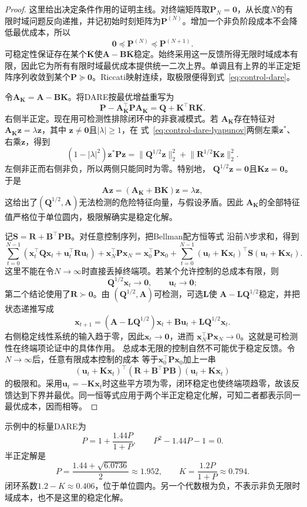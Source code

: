 \begin{proof}
这里给出决定条件作用的证明主线。对终端矩阵取$\bm{P}_N=\bm{0}$，从长度$N$的有限时域问题反向递推，并记初始时刻矩阵为$\bm{P}^{(N)}$。增加一个非负阶段成本不会降低最优成本，所以
\[
  \bm{0}\preceq
  \bm{P}^{(N)}
  \preceq
  \bm{P}^{(N+1)}.
\]
可稳定性保证存在某个$\overline{\bm{K}}$使$\bm{A}-\bm{B}\overline{\bm{K}}$稳定。始终采用这一反馈所得无限时域成本有限，因此它为所有有限时域最优成本提供统一二次上界。单调且有上界的半正定矩阵序列收敛到某个$\bm{P}\succeq\bm{0}$。Riccati映射连续，取极限便得到式~\eqref{eq:control-dare}。

令$\bm{A}_{\bm{K}}=\bm{A}-\bm{B}\bm{K}$。将DARE按最优增益重写为
\begin{equation}
  \bm{P}
  -
  \bm{A}_{\bm{K}}^{\top}
  \bm{P}\bm{A}_{\bm{K}}
  =
  \bm{Q}+\bm{K}^{\top}\bm{R}\bm{K}.
  \label{eq:control-dare-lyapunov}
\end{equation}
右侧半正定。现在用可检测性排除闭环中的非衰减模式。若
$\bm{A}_{\bm K}$存在特征对
$\bm{A}_{\bm K}\bm{z}=\lambda\bm{z}$，其中
$\bm{z}\neq\bm{0}$且$|\lambda|\geq1$，在
式~\eqref{eq:control-dare-lyapunov}两侧左乘$\bm{z}^{*}$、右乘$\bm{z}$，得到
\[
  (1-|\lambda|^2)\bm{z}^{*}\bm{P}\bm{z}
  =
  \lVert\bm{Q}^{1/2}\bm{z}\rVert_2^2
  +
  \lVert\bm{R}^{1/2}\bm{K}\bm{z}\rVert_2^2.
\]
左侧非正而右侧非负，所以两侧只能同时为零。特别地，
$\bm{Q}^{1/2}\bm{z}=\bm{0}$且$\bm{K}\bm{z}=\bm{0}$。于是
\[
  \bm{A}\bm{z}
  =
  (\bm{A}_{\bm K}+\bm{B}\bm{K})\bm{z}
  =
  \lambda\bm{z},
\]
这给出了$(\bm{Q}^{1/2},\bm{A})$无法检测的危险特征向量，与假设矛盾。因此
$\bm{A}_{\bm K}$的全部特征值严格位于单位圆内，极限解确实是稳定化解。

记$\bm{S}=\bm{R}+\bm{B}^{\top}\bm{P}\bm{B}$。对任意控制序列，把Bellman配方恒等式
沿前$N$步求和，得到
\[
  \sum_{t=0}^{N-1}
  \left(
    \bm{x}_t^{\top}\bm{Q}\bm{x}_t
    +
    \bm{u}_t^{\top}\bm{R}\bm{u}_t
  \right)
  +
  \bm{x}_N^{\top}\bm{P}\bm{x}_N
  =
  \bm{x}_0^{\top}\bm{P}\bm{x}_0
  +
  \sum_{t=0}^{N-1}
  (\bm{u}_t+\bm{K}\bm{x}_t)^{\top}
  \bm{S}
  (\bm{u}_t+\bm{K}\bm{x}_t).
\]
这里不能在令$N\to\infty$时直接丢掉终端项。若某个允许控制的总成本有限，则
\[
  \bm{Q}^{1/2}\bm{x}_t\to\bm{0},
  \qquad
  \bm{u}_t\to\bm{0};
\]
第二个结论使用了$\bm{R}\succ\bm{0}$。由
$(\bm{Q}^{1/2},\bm{A})$可检测，可选$\bm{L}$使
$\bm{A}-\bm{L}\bm{Q}^{1/2}$稳定，并把状态递推写成
\[
  \bm{x}_{t+1}
  =
  (\bm{A}-\bm{L}\bm{Q}^{1/2})\bm{x}_t
  +
  \bm{B}\bm{u}_t
  +
  \bm{L}\bm{Q}^{1/2}\bm{x}_t.
\]
右侧稳定线性系统的输入趋于零，因此$\bm{x}_t\to\bm{0}$，进而
$\bm{x}_N^{\top}\bm{P}\bm{x}_N\to0$。这就是可检测性在终端项论证中的具体作用。
总成本无限的控制自然不可能优于稳定反馈。令$N\to\infty$后，任意有限成本控制的成本
等于$\bm{x}_0^{\top}\bm{P}\bm{x}_0$加上一串
\[
  (\bm{u}_t+\bm{K}\bm{x}_t)^{\top}
  (\bm{R}+\bm{B}^{\top}\bm{P}\bm{B})
  (\bm{u}_t+\bm{K}\bm{x}_t)
\]
的极限和。采用$\bm{u}_t=-\bm{K}\bm{x}_t$时这些平方项为零，闭环稳定也使终端项趋零，故该反馈达到下界并最优。同一恒等式应用于两个半正定稳定化解，可知二者都表示同一最优成本，因而相等。
\end{proof}
示例中的标量DARE为
\[
  P=1+\frac{1.44P}{1+P},
  \qquad
  P^2-1.44P-1=0.
\]
半正定解是
\[
  P=\frac{1.44+\sqrt{6.0736}}{2}\approx1.952,
  \qquad
  K=\frac{1.2P}{1+P}\approx0.794.
\]
闭环系数$1.2-K\approx0.406$，位于单位圆内。另一个代数根为负，不表示非负无限时域成本，也不是这里的稳定化解。

